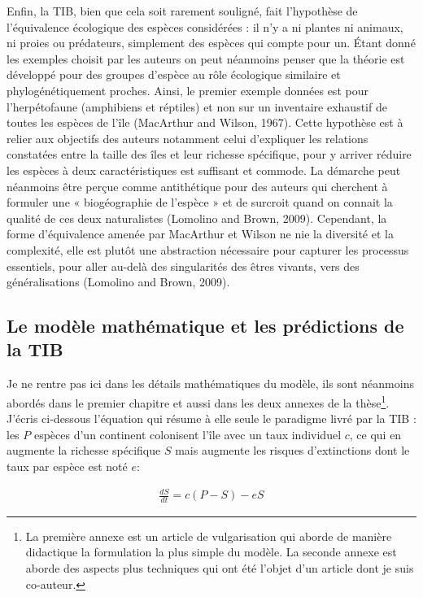 Enfin, la TIB, bien que cela soit rarement souligné, fait l'hypothèse de
l'équivalence écologique des espèces considérées : il n'y a ni plantes
ni animaux, ni proies ou prédateurs, simplement des espèces qui compte
pour un. Étant donné les exemples choisit par les auteurs on peut
néanmoins penser que la théorie est développé pour des groupes d'espèce
au rôle écologique similaire et phylogénétiquement proches. Ainsi, le
premier exemple données est pour l'herpétofaune (amphibiens et réptiles)
et non sur un inventaire exhaustif de toutes les espèces de l'île
(MacArthur and Wilson, 1967). Cette hypothèse est à relier aux objectifs
des auteurs notamment celui d'expliquer les relations constatées entre
la taille des îles et leur richesse spécifique, pour y arriver réduire
les espèces à deux caractéristiques est suffisant et commode. La
démarche peut néanmoins être perçue comme antithétique pour des auteurs
qui cherchent à formuler une « biogéographie de l'espèce » et de
surcroit quand on connait la qualité de ces deux naturalistes (Lomolino
and Brown, 2009). Cependant, la forme d'équivalence amenée par MacArthur
et Wilson ne nie la diversité et la complexité, elle est plutôt une
abstraction nécessaire pour capturer les processus essentiels, pour
aller au-delà des singularités des êtres vivants, vers des
généralisations (Lomolino and Brown, 2009).

\subsection*{Le modèle mathématique et les prédictions de la
TIB}\label{le-moduxe8le-mathuxe9matique-et-les-pruxe9dictions-de-la-tib}

Je ne rentre pas ici dans les détails mathématiques du modèle, ils sont
néanmoins abordés dans le premier chapitre et aussi dans les deux
annexes de la thèse\footnote{La première annexe est un article de
  vulgarisation qui aborde de manière didactique la formulation la plus
  simple du modèle. La seconde annexe est aborde des aspects plus
  techniques qui ont été l'objet d'un article dont je suis co-auteur.}.
J'écris ci-dessous l'équation qui résume à elle seule le paradigme livré
par la TIB : les \(P\) espèces d'un continent colonisent l'île avec un
taux individuel \(c\), ce qui en augmente la richesse spécifique \(S\)
mais augmente les risques d'extinctions dont le taux par espèce est noté
\(e\):

\begin{eqnarray}
\label{eqMW}
\frac{dS}{dt} = c(P-S)-eS
\end{eqnarray}

